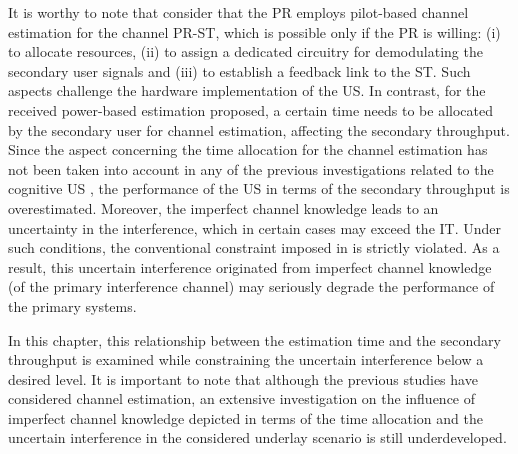 It is worthy to note that \cite{Musa09, Suraweera10, Kim12, Alou12, Stat12, Alou13, Zhang13, Smith13, Li13, Kerr14} consider that the PR employs pilot-based channel estimation for the channel PR-ST, which is possible only if the PR is willing: (i) to allocate resources, (ii) to assign a dedicated circuitry for demodulating the secondary user signals and (iii) to establish a feedback link to the ST. Such aspects challenge the hardware implementation of the US. In contrast, for the received power-based estimation proposed, a certain time needs to be allocated by the secondary user for channel estimation, affecting the secondary throughput. Since the aspect concerning the time allocation for the channel estimation has not been taken into account in any of the previous investigations related to the cognitive US \cite{Musa09, Suraweera10, Kim12, Alou12, Stat12, Alou13, Zhang13, Smith13, Li13, Kerr14}, the performance of the US in terms of the secondary throughput is overestimated. Moreover, the imperfect channel knowledge leads to an uncertainty in the interference, which in certain cases may exceed the IT. Under such conditions, the conventional constraint imposed in \cite{Xing07, Ghasemi07, Kang09, Musa09_} is strictly violated. As a result, this uncertain interference originated from imperfect channel knowledge (of the primary interference channel) may seriously degrade the performance of the primary systems. 


 In this chapter, this relationship between the estimation time and the secondary throughput is examined while constraining the uncertain interference below a desired level. It is important to note that although the previous studies have considered channel estimation, an extensive investigation on the influence of imperfect channel knowledge depicted in terms of the time allocation and the uncertain interference in the considered underlay scenario is still underdeveloped.
 


